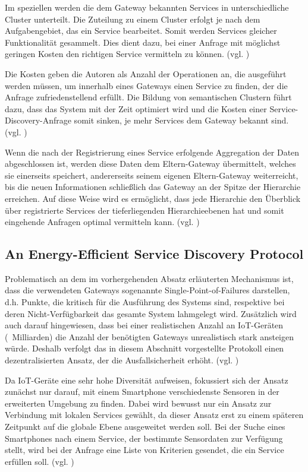 \documentclass[conference,compsoc]{IEEEtran}
\begin{document}
Im speziellen werden die dem Gateway bekannten Services in unterschiedliche Cluster unterteilt. Die Zuteilung zu einem Cluster erfolgt je nach dem Aufgabengebiet, das ein Service bearbeitet. Somit werden Services gleicher Funktionalität gesammelt. Dies dient dazu, bei einer Anfrage mit möglichst geringen Kosten den richtigen Service vermitteln zu können. (vgl. \cite{efficientSemantic})

Die Kosten geben die Autoren als Anzahl der Operationen an, die ausgeführt werden müssen, um innerhalb eines Gateways einen Service zu finden, der die Anfrage zufriedenstellend erfüllt. Die Bildung von semantischen Clustern führt dazu, dass das System mit der Zeit optimiert wird und die Kosten einer Service-Discovery-Anfrage somit sinken, je mehr Services dem Gateway bekannt sind. (vgl. \cite{efficientSemantic})

Wenn die nach der Registrierung eines Service erfolgende Aggregation der Daten abgeschlossen ist, werden diese Daten dem Eltern-Gateway übermittelt, welches sie einerseits speichert, andererseits seinem eigenen Eltern-Gateway weiterreicht, bis die neuen Informationen schließlich das Gateway an der Spitze der Hierarchie erreichen. Auf diese Weise wird es ermöglicht, dass jede Hierarchie den Überblick über registrierte Services der tieferliegenden Hierarchieebenen hat und somit eingehende Anfragen optimal vermitteln kann. (vgl. \cite{efficientSemantic})

\subsection{An Energy-Efficient Service Discovery Protocol}

Problematisch an dem im vorhergehenden Absatz erläuterten Mechanismus ist, dass die verwendeten Gateways sogenannte Single-Point-of-Failures darstellen, d.h. Punkte, die kritisch für die Ausführung des Systems sind, respektive bei deren Nicht-Verfügbarkeit das gesamte System lahmgelegt wird. Zusätzlich wird auch darauf hingewiesen, dass bei einer realistischen Anzahl an IoT-Geräten (~Milliarden) die Anzahl der benötigten Gateways unrealistisch stark ansteigen würde. Deshalb verfolgt das in diesem Abschnitt vorgestellte Protokoll einen dezentralisierten Ansatz, der die Ausfallsicherheit erhöht. (vgl. \cite{energy-efficient})

Da IoT-Geräte eine sehr hohe Diversität aufweisen, fokussiert sich der Ansatz zunächst nur darauf, mit einem Smartphone verschiedenste Sensoren in der erweiterten Umgebung zu finden. Dabei wird bewusst nur ein Ansatz zur Verbindung mit lokalen Services gewählt, da dieser Ansatz erst zu einem späteren Zeitpunkt auf die globale Ebene ausgeweitet werden soll. Bei der Suche eines Smartphones nach einem Service, der bestimmte Sensordaten zur Verfügung stellt, wird bei der Anfrage eine Liste von Kriterien gesendet, die ein Service erfüllen soll. (vgl. \cite{energy-efficient})
\end{document}
